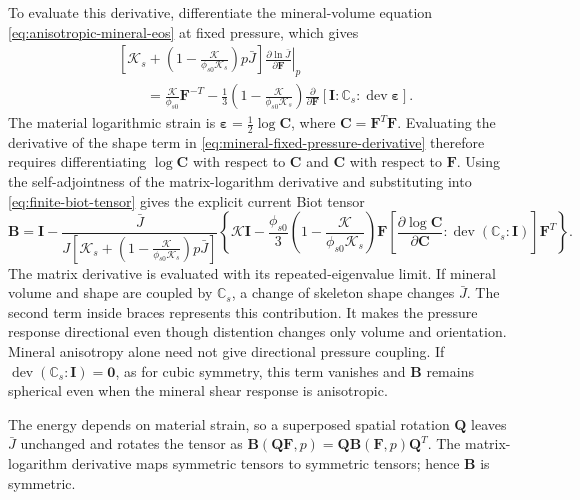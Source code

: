 \documentclass[11pt]{article}
\newcommand{\dev}{\operatorname{dev}}
\newcommand{\pder}[2]{\frac{\partial #1}{\partial #2}}
\begin{document}
To evaluate this derivative, differentiate the mineral-volume equation
\eqref{eq:anisotropic-mineral-eos} at fixed pressure, which gives
\begin{align}
 &\left[\mathcal{K}_s+\left(1-\frac{\mathcal{K}}{\phi_{s0}\mathcal{K}_s}\right)p\bar J\right]
     \left.\pder{\ln\bar J}{\mathbf F}\right|_p
 \nonumber\\
 &\qquad=\frac{\mathcal{K}}{\phi_{s0}}\mathbf F^{-T}
 -\frac13\left(1-\frac{\mathcal{K}}{\phi_{s0}\mathcal{K}_s}\right)
   \pder{}{\mathbf F}
   \left[\mathbf I:\mathbb{C}_s:\dev\mathbf\varepsilon\right].
 \label{eq:mineral-fixed-pressure-derivative}
\end{align}
The material logarithmic strain is
\(\mathbf\varepsilon=\tfrac12\log\mathbf C\), where
\(\mathbf C=\mathbf F^T\mathbf F\). Evaluating the derivative of the
shape term in \eqref{eq:mineral-fixed-pressure-derivative} therefore
requires differentiating \(\log\mathbf C\) with respect to \(\mathbf C\)
and \(\mathbf C\) with respect to \(\mathbf F\).
Using the self-adjointness of the matrix-logarithm derivative and
substituting into \eqref{eq:finite-biot-tensor} gives the explicit current
Biot tensor
\begin{equation}
 \mathbf B
 =\mathbf I-\frac{\bar J}
 {J\left[\mathcal{K}_s+\left(1-\frac{\mathcal{K}}{\phi_{s0}\mathcal{K}_s}\right) p\bar J\right]}
 \left\{\mathcal{K}\mathbf I
 -\frac{\phi_{s0}}3\left(1-\frac{\mathcal{K}}{\phi_{s0}\mathcal{K}_s}\right)
 \mathbf F\left[\pder{\log\mathbf C}{\mathbf C}:
       \dev(\mathbb{C}_s:\mathbf I)\right]\mathbf F^T
 \right\}.
 \label{eq:anisotropic-biot-explicit}
\end{equation}
The matrix derivative is evaluated with its repeated-eigenvalue limit. If mineral volume and shape are coupled
by \(\mathbb{C}_s\), a change of skeleton shape changes \(\bar J\).
The second term inside braces represents this contribution. It makes the
pressure response directional even though distention changes only volume and orientation.
Mineral anisotropy alone need not give directional pressure coupling.
If \(\dev(\mathbb{C}_s:\mathbf I)=\mathbf0\), as for cubic symmetry,
this term vanishes and \(\mathbf B\) remains spherical even when the
mineral shear response is anisotropic.

The energy depends on material strain, so a superposed spatial rotation
\(\mathbf Q\) leaves \(\bar J\) unchanged and rotates the tensor as
\(\mathbf B(\mathbf Q\mathbf F,p)=\mathbf Q\mathbf B(\mathbf F,p)
\mathbf Q^T\). The matrix-logarithm derivative maps symmetric tensors
to symmetric tensors; hence \(\mathbf B\) is symmetric.
\end{document}
